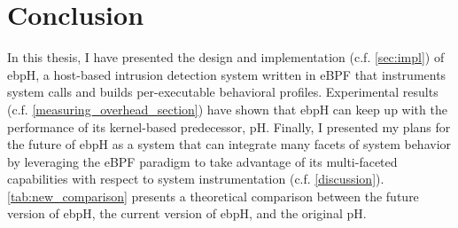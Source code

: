 \documentclass[
  12pt]{findlay}
\begin{document}
\hypertarget{conclusion}{%
\section{Conclusion}\label{conclusion}}

In this thesis, I have presented the design and implementation (c.f.
\autoref{sec:impl}) of ebpH, a host-based intrusion detection system
written in eBPF that instruments system calls and builds per-executable
behavioral profiles. Experimental results (c.f.
\autoref{measuring_overhead_section}) have shown that ebpH can keep up
with the performance of its kernel-based predecessor, pH. Finally, I
presented my plans for the future of ebpH as a system that can integrate
many facets of system behavior by leveraging the eBPF paradigm to take
advantage of its multi-faceted capabilities with respect to system
instrumentation (c.f. \autoref{discussion}).
\autoref{tab:new_comparison} presents a theoretical comparison between
the future version of ebpH, the current version of ebpH, and the
original pH.

\begin{table}
    \caption[Revisiting the comparison of ebpH and pH in light of topics for future work]{
        Revisiting the comparison of ebpH and pH in light of topics for future work.
        Note that \texttt{ebpH 1.0} represents the current version of ebpH, while
        \texttt{ebpH 2.0} represents the future version of ebpH that was discussed in
        \autoref{future-work}.
    }
    \label{tab:new_comparison}
\end{table}
\end{document}

